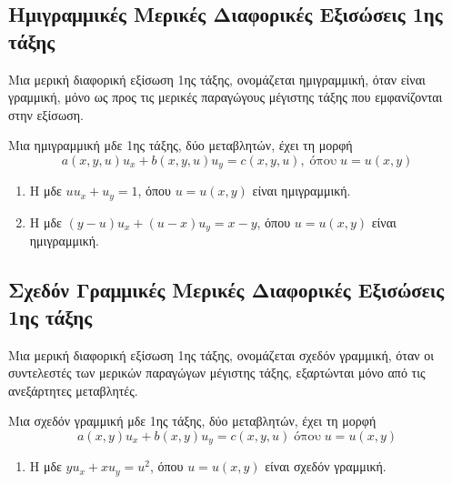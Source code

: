 \subsection*{Ημιγραμμικές Μερικές Διαφορικές Εξισώσεις 1ης τάξης}

\begin{mybox1}
  \begin{dfn}
    Μια μερική διαφορική εξίσωση 1ης τάξης, ονομάζεται \textcolor{Col1}{ημιγραμμική}, 
    όταν είναι γραμμική, μόνο ως προς τις μερικές παραγώγους μέγιστης τάξης που 
    εμφανίζονται στην εξίσωση.
  \end{dfn}
\end{mybox1}

\begin{rem}
  Μια ημιγραμμική μδε 1ης τάξης, δύο μεταβλητών, έχει τη μορφή
  \[ a(x,y,u)u_{x} + b(x,y,u)u_{y} = c(x,y,u), \; \text{όπου} \; u=u(x,y) \]
\end{rem}

\begin{examples} \item {}
  \begin{enumerate}
    \item Η μδε $uu_{x}+u_{y}=1$, όπου $ u=u(x,y) $  είναι ημιγραμμική.
    \item Η μδε $ (y-u)u_{x} + (u-x)u_{y} = x-y $, όπου $ u=u(x,y) $  είναι ημιγραμμική.
  \end{enumerate}
\end{examples}


\subsection*{Σχεδόν Γραμμικές Μερικές Διαφορικές Εξισώσεις 1ης τάξης}

\begin{mybox1}
  \begin{dfn}
    Μια μερική διαφορική εξίσωση 1ης τάξης, ονομάζεται 
    \textcolor{Col1}{σχεδόν γραμμική}, όταν οι συντελεστές των μερικών παραγώγων 
    μέγιστης τάξης, εξαρτώνται μόνο από τις ανεξάρτητες μεταβλητές.
  \end{dfn}
\end{mybox1}

\begin{rem}
  Μια σχεδόν γραμμική μδε 1ης τάξης, δύο μεταβλητών, έχει τη μορφή
  \[  a(x,y) u_{x} + b(x,y) u_{y} = c(x,y,u) \; \text{όπου} \; u=u(x,y) \]
\end{rem}

\begin{examples} \item {}
  \begin{enumerate}
    \item Η μδε $yu_{x}+xu_{y}=u^{2}$, όπου $ u=u(x,y) $  είναι σχεδόν γραμμική.
  \end{enumerate}
\end{examples}



